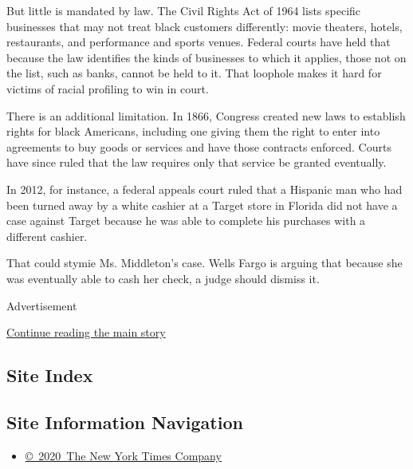 But little is mandated by law. The Civil Rights Act of 1964 lists
specific businesses that may not treat black customers differently:
movie theaters, hotels, restaurants, and performance and sports venues.
Federal courts have held that because the law identifies the kinds of
businesses to which it applies, those not on the list, such as banks,
cannot be held to it. That loophole makes it hard for victims of racial
profiling to win in court.

There is an additional limitation. In 1866, Congress created new laws to
establish rights for black Americans, including one giving them the
right to enter into agreements to buy goods or services and have those
contracts enforced. Courts have since ruled that the law requires only
that service be granted eventually.

In 2012, for instance, a federal appeals court ruled that a Hispanic man
who had been turned away by a white cashier at a Target store in Florida
did not have a case against Target because he was able to complete his
purchases with a different cashier.

That could stymie Ms. Middleton's case. Wells Fargo is arguing that
because she was eventually able to cash her check, a judge should
dismiss it.

Advertisement

\protect\hyperlink{after-bottom}{Continue reading the main story}

\hypertarget{site-index}{%
\subsection{Site Index}\label{site-index}}

\hypertarget{site-information-navigation}{%
\subsection{Site Information
Navigation}\label{site-information-navigation}}

\begin{itemize}
\tightlist
\item
  \href{https://help.nytimes3xbfgragh.onion/hc/en-us/articles/115014792127-Copyright-notice}{©~2020~The
  New York Times Company}
\end{itemize}

